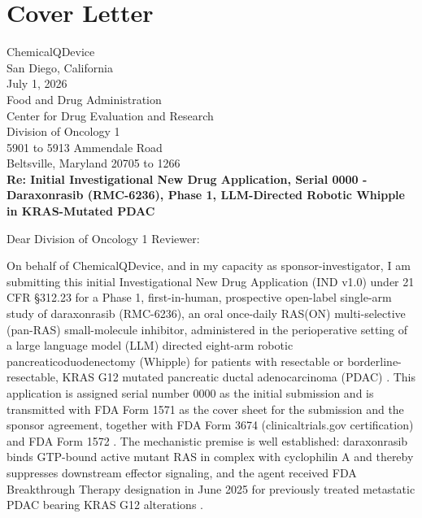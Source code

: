 \section*{Cover Letter}

\noindent ChemicalQDevice \\
San Diego, California \\
July 1, 2026 \\[0.5em]
Food and Drug Administration \\
Center for Drug Evaluation and Research \\
Division of Oncology 1 \\
5901 to 5913 Ammendale Road \\
Beltsville, Maryland 20705 to 1266 \\[0.5em]

\noindent\textbf{Re: Initial Investigational New Drug Application, Serial 0000 - Daraxonrasib (RMC-6236), Phase 1, LLM-Directed Robotic Whipple in KRAS-Mutated PDAC}

\noindent Dear Division of Oncology 1 Reviewer:

On behalf of ChemicalQDevice, and in my capacity as sponsor-investigator, I am submitting this initial Investigational New Drug Application (IND v1.0) under 21 CFR \S 312.23 for a Phase 1, first-in-human, prospective open-label single-arm study of daraxonrasib (RMC-6236), an oral once-daily RAS(ON) multi-selective (pan-RAS) small-molecule inhibitor, administered in the perioperative setting of a large language model (LLM) directed eight-arm robotic pancreaticoduodenectomy (Whipple) for patients with resectable or borderline-resectable, KRAS G12 mutated pancreatic ductal adenocarcinoma (PDAC) \cite{daraxwhipple,onpremwhippl}. This application is assigned serial number 0000 as the initial submission and is transmitted with FDA Form 1571 as the cover sheet for the submission and the sponsor agreement, together with FDA Form 3674 (clinicaltrials.gov certification) and FDA Form 1572 \cite{cfr312paiuni}. The mechanistic premise is well established: daraxonrasib binds GTP-bound active mutant RAS in complex with cyclophilin A and thereby suppresses downstream effector signaling, and the agent received FDA Breakthrough Therapy designation in June 2025 for previously treated metastatic PDAC bearing KRAS G12 alterations \cite{daraxwhipple,pdac060s2030}.

